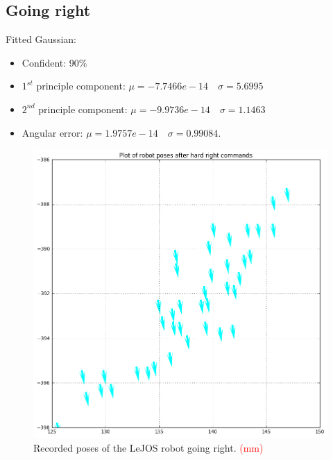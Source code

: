 \documentclass[paper=a4, fontsize=11pt]{scrartcl} %
\begin{document}
    \subsection{Going right}
	 Fitted Gaussian:
	 \begin{itemize}
	    \item Confident: 90\%
	  	\item $1^{st}$ principle component: $\mu = -7.7466e-14 \quad \sigma = 5.6995$
	  	\item $2^{nd}$ principle component: $\mu = -9.9736e-14 \quad \sigma = 1.1463$
	  	\item Angular error: $\mu = 1.9757e-14 \quad \sigma = 0.99084$.
	 \end{itemize}
    \begin{figure}[H]
        \begin{center}
            \setlength{\fboxsep}{0.5pt} %
            \setlength{\fboxrule}{0.5pt}
            \includegraphics[width=12cm,fbox]{images/poses_plot_5_right.png}
            \caption{Recorded poses of the LeJOS robot going right. \textcolor{red}{(mm)}}
        \end{center}
    \end{figure}
\end{document}
